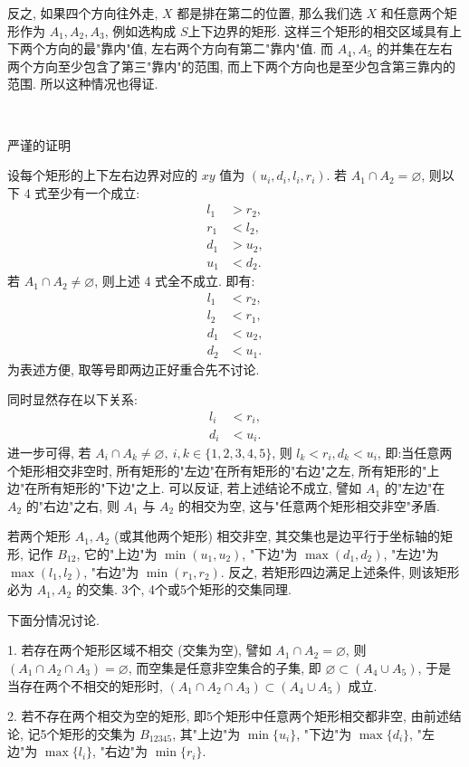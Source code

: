反之, 如果四个方向往外走, $X$ 都是排在第二的位置, 那么我们选 $X$ 和任意两个矩形作为 $A_1, A_2, A_3$, 例如选构成 $S$上下边界的矩形. 这样三个矩形的相交区域具有上下两个方向的最"靠内"值, 左右两个方向有第二"靠内"值. 而 $A_4, A_5$ 的并集在左右两个方向至少包含了第三"靠内"的范围, 而上下两个方向也是至少包含第三靠内的范围. 所以这种情况也得证.

~ 

\noindent 严谨的证明

设每个矩形的上下左右边界对应的 $xy$ 值为 $(u_i, d_i, l_i, r_i)$. 若 $A_1 \cap A_2 = \varnothing$, 则以下 4 式至少有一个成立:
\begin{align*}
l_1 &> r_2, \\
r_1 &< l_2, \\
d_1 &> u_2, \\
u_1 &< d_2.
\end{align*}
若 $A_1\cap A_2 \neq \varnothing$, 则上述 4 式全不成立. 即有:
\begin{align*}
l_1 &< r_2, \\
l_2 &< r_1, \\
d_1 &< u_2, \\
d_2 &< u_1.
\end{align*}
为表述方便, 取等号即两边正好重合先不讨论.

同时显然存在以下关系:
\begin{align*}
l_i &< r_i, \\
d_i &< u_i.
\end{align*}
进一步可得, 若 $A_i\cap A_k\neq\varnothing,\ i,k\in\{1,2,3,4,5\}$, 则 $l_k < r_i, d_k < u_i$, 即:当任意两个矩形相交非空时, 所有矩形的"左边"在所有矩形的"右边"之左, 所有矩形的"上边"在所有矩形的"下边"之上.
可以反证, 若上述结论不成立, 譬如 $A_1$ 的"左边"在 $A_2$ 的"右边"之右, 则 $A_1$ 与 $A_2$ 的相交为空, 这与"任意两个矩形相交非空"矛盾.

若两个矩形 $A_1, A_2$ (或其他两个矩形) 相交非空, 其交集也是边平行于坐标轴的矩形, 记作 $B_{12}$, 它的"上边"为 $\min(u_1, u_2)$, "下边"为 $\max(d_1, d_2)$, "左边"为 $\max(l_1,l_2)$, "右边"为 $\min(r_1, r_2)$. 反之, 若矩形四边满足上述条件, 则该矩形必为 $A_1, A_2$ 的交集. 3个, 4个或5个矩形的交集同理.

下面分情况讨论.

1. 若存在两个矩形区域不相交 (交集为空), 譬如 $A_1\cap A_2=\varnothing$, 则 $(A_1\cap A_2\cap A_3)=\varnothing$, 而空集是任意非空集合的子集, 即 $ \varnothing\subset(A_4\cup A_5) $, 于是当存在两个不相交的矩形时, $(A_1\cap A_2\cap A_3) \subset (A_4\cup A_5)$ 成立. 


2. 若不存在两个相交为空的矩形, 即5个矩形中任意两个矩形相交都非空, 由前述结论, 记5个矩形的交集为 $B_{12345}$, 其"上边"为 $\min\{u_i\}$, "下边"为 $\max\{d_i\}$, "左边"为 $\max\{l_i\}$, "右边"为 $\min\{r_i\}$. 

